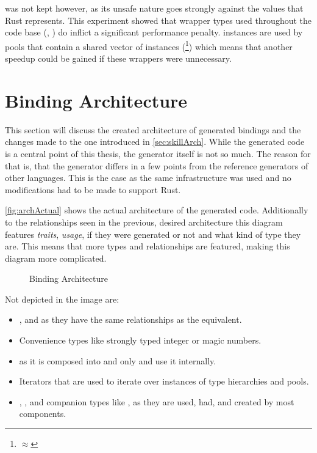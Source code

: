 \documentclass[thesis]{subfiles}
\begin{document}
      \HazardPtrT was not kept however, as its unsafe nature goes strongly against the values that Rust represents.
      This experiment showed that wrapper types used throughout the code base (\RcT, \RefCellT) do inflict a significant performance penalty.
      \PtrT instances are used by pools that contain a shared vector of \PtrT instances (\footnote{
         $\approx$ 
      }) which means that another speedup could be gained if these wrappers were unnecessary.

\section{Binding Architecture}
  This section will discuss the created architecture of generated bindings and the changes made to the one introduced in \autoref{sec:skillArch}.
  While the generated code is a central point of this thesis, the generator itself is not so much.
  The reason for that is, that the generator differs in a few points from the reference generators of other languages.
  This is the case as the same infrastructure was used and no modifications had to be made to support Rust.

  \autoref{fig:archActual} shows the actual architecture of the generated code.
  Additionally to the relationships seen in the previous, desired architecture this diagram features \emph{traits}, \emph{usage}, if they were generated or not and what kind of type they are.
  This means that more types and relationships are featured, making this diagram more complicated.

  \begin{figure}[H]
    \centering
    
    \caption{Binding Architecture}\label{fig:archActual}
  \end{figure}

  Not depicted in the image are:
  \begin{itemize}
    \item \ForeignPool, \ForeignObject and \ForeignFieldDeclaration as they have the same relationships as the \UserType equivalent.
    \item Convenience types like strongly typed integer or magic numbers.
    \item \StringBlock as it is composed into \StringPool and only \FileReader and \FileWriter use it internally.
    \item Iterators that are used to iterate over instances of type hierarchies and pools.
    \item \SkillString, \SkillFail, \PtrT and \PtrT companion types like \WeakT, as they are used, had, and created by most components.
  \end{itemize}
\end{document}

